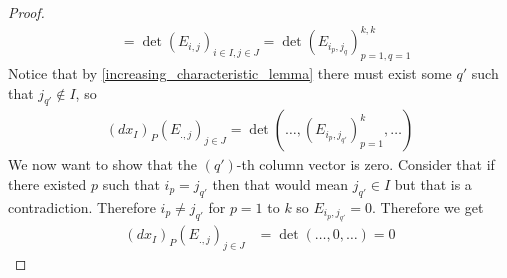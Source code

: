 \documentclass[notes]{subfiles}
\begin{document}
\begin{proof}
\begin{align*}
        &= \det(E_{i, j})_{i \in I, j \in J}
        = \det(E_{i_p, j_q})_{p = 1, q = 1}^{k, k}
    \end{align*}
    Notice that by \cref{increasing_characteristic_lemma} there must exist some $q'$ such that $j_{q'} \notin I$, so
    \begin{align*}
        (dx_I)_P(E_{., j})_{j \in J}
        = \det(\ldots, (E_{i_p, j_{q'}})_{p = 1}^k, \ldots)
    \end{align*}
    We now want to show that the $(q')$-th column vector is zero. Consider that if there existed $p$ such that $i_p = j_{q'}$ then that would mean $j_{q'} \in I$ but that is a contradiction. Therefore $i_p \neq j_{q'}$ for $p = 1$ to $k$ so $E_{i_p, j_{q'}} = 0$. Therefore we get
    \begin{align*}
        (dx_I)_P(E_{., j})_{j \in J}
        &= \det(\ldots, 0, \ldots)
        = 0
    \end{align*}
\end{proof}
\end{document}
